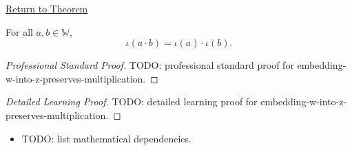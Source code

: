 \newpage
{}
\label{prf:embedding-w-into-z-preserves-multiplication}

\begin{remark*}[Return]
\hyperref[thm:embedding-w-into-z-preserves-multiplication]{Return to Theorem}
\end{remark*}

\begin{theorem*}
For all $a,b\in\mathbb{W}$,
\[
\iota(a\cdot b)=\iota(a)\cdot\iota(b).
\]
\end{theorem*}

\begin{proof}[Professional Standard Proof]
\LRAProofBodyStart
TODO: professional standard proof for embedding-w-into-z-preserves-multiplication.
\end{proof}

\begin{proof}[Detailed Learning Proof]
\LRAProofBodyStart
TODO: detailed learning proof for embedding-w-into-z-preserves-multiplication.
\end{proof}

\begin{remark*}
\end{remark*}

\begin{dependencies}
\begin{itemize}
  \item TODO: list mathematical dependencies.
\end{itemize}
\end{dependencies}

\clearpage
